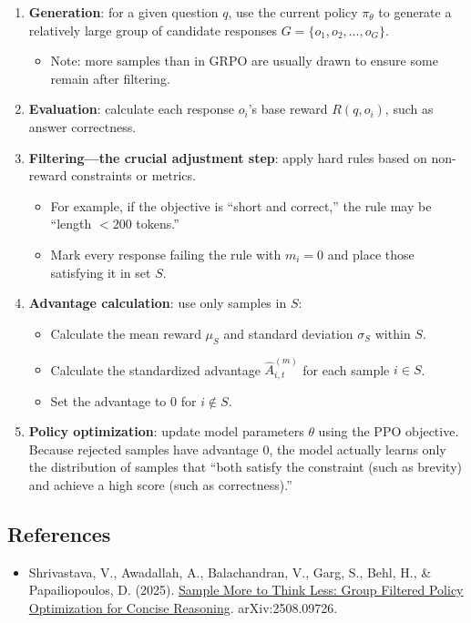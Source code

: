 \begin{enumerate}
\def\labelenumi{\arabic{enumi}.}
\tightlist
\item
  \textbf{Generation}: for a given question \(q\), use the current policy \(\pi_\theta\) to generate a relatively large group of candidate responses \(G=\{o_1,o_2,\ldots,o_G\}\).

  \begin{itemize}
  \tightlist
  \item
    Note: more samples than in GRPO are usually drawn to ensure some remain after filtering.
  \end{itemize}
\item
  \textbf{Evaluation}: calculate each response \(o_i\)'s base reward \(R(q,o_i)\), such as answer correctness.
\item
  \textbf{Filtering---the crucial adjustment step}: apply hard rules based on non-reward constraints or metrics.

  \begin{itemize}
  \tightlist
  \item
    For example, if the objective is ``short and correct,'' the rule may be ``length \(<200\) tokens.''
  \item
    Mark every response failing the rule with \(m_i=0\) and place those satisfying it in set \(S\).
  \end{itemize}
\item
{}
  \textbf{Advantage calculation}: use only samples in \(S\):

  \begin{itemize}
  \tightlist
  \item
    Calculate the mean reward \(\mu_S\) and standard deviation \(\sigma_S\) within \(S\).
  \item
    Calculate the standardized advantage \(\hat{A}_{i,t}^{(m)}\) for each sample \(i \in S\).
  \item
    Set the advantage to \(0\) for \(i \notin S\).
  \end{itemize}
\item
  \textbf{Policy optimization}: update model parameters \(\theta\) using the PPO objective. Because rejected samples have advantage \(0\), the model actually learns only the distribution of samples that ``both satisfy the constraint (such as brevity) and achieve a high score (such as correctness).''
\end{enumerate}

\FloatBarrier
{}
\hypertarget{references-112}{%
\subsection{References}\label{references-112}}

\vspace{0.25em}
\begin{itemize}
\tightlist
\item
  Shrivastava, V., Awadallah, A., Balachandran, V., Garg, S., Behl, H., \& Papailiopoulos, D. (2025). \href{https://arxiv.org/abs/2508.09726}{Sample More to Think Less: Group Filtered Policy Optimization for Concise Reasoning}. arXiv:2508.09726.
\end{itemize}

\clearpage

